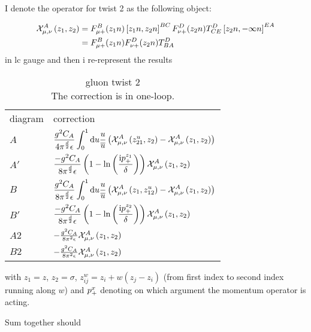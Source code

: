I denote the operator for twist 2 as the following object:

\begin{align}
	\twtwoop{z_1}{z_2}{A}{\mu}{\nu}
	&=
	\ft_{\mu +}^B(z_1n)\wil{z_1n}{z_2n}^{BC}\ft_{\nu+}^D(z_2n)T^D_{CE}\wil{z_2n}{-\infty n}^{EA}
	\\
	&=
	\ft_{\mu +}^B(z_1n)\ft_{\nu+}^D(z_2n)T^D_{BA}
\end{align}
in lc gauge 
and then i re-represent the results 

\def\verticaldistance{\vspace{0.5cm}}
\begin{table}
	\begin{tabular}{p{2cm}p{14cm}}
		diagram&correction \\
		$A$ & ${\displaystyle \frac{g^2C_A}{4\pi^{\frac{d}{2}}\epsilon}
		\int_0^1 \dx u \frac{u}{\overline u}\left(\twtwoop{z_{21}^{u}}{z_2}{A}{\mu}{\nu}  - \twtwoop{z_1}{z_2}{A}{\mu}{\nu} \right)}$\verticaldistance \\
		$A'$ & ${\displaystyle \frac{-g^2C_A}{8\pi^{\frac{d}{2}}\epsilon}\left(1-\ln\left(\frac{\imag \ppon{z_1}}{\delta}\right)\right)\twtwoop{z_1}{z_2}{A}{\mu}{\nu} }$\verticaldistance \\
		$B$ & ${\displaystyle \frac{g^2C_A}{8\pi^{\frac{d}{2}}\epsilon} \int _0^1 \dx u \frac{u}{\overline u} \left(\twtwoop{z_1}{z_{12}^u}{A}{\mu}{\nu} - \twtwoop{z_1}{z_2}{A}{\mu}{\nu} \right)}$ \verticaldistance \\
		$B'$ & ${\displaystyle 	 \frac{-g^2C_A}{8\pi^{\frac{d}{2}}\epsilon}\left(1-\ln\left(\frac{\imag \ppon{z_2}}{\delta}\right)\right)\twtwoop{z_1}{z_2}{A}{\mu}{\nu}}$\verticaldistance \\
		$A2$ & $-\frac{ g^2 C_A}{8\pi^2 \epsilon} \twtwoop{z_1}{z_2}{A}{\mu}{\nu} $  \verticaldistance \\
		$B2$ & $-\frac{ g^2 C_A}{8\pi^2 \epsilon} \twtwoop{z_1}{z_2}{A}{\mu}{\nu} $\verticaldistance \\
	\end{tabular}
	\caption[caption]{gluon twist 2 \\\hspace{\textwidth}The correction is in one-loop.}
	\label{Resultsgluontwist2table}
\end{table}
with $z_1 =z$, $z_2 = \sigma$, $z_{ij}^w = z_i + w(z_j-z_i)$ (from first index to second index running along $w$) and $\ppon{x} $ denoting on which argument the momentum operator is acting.

Sum together should 

\ifdefined\mainprogram{}
\else

\fi